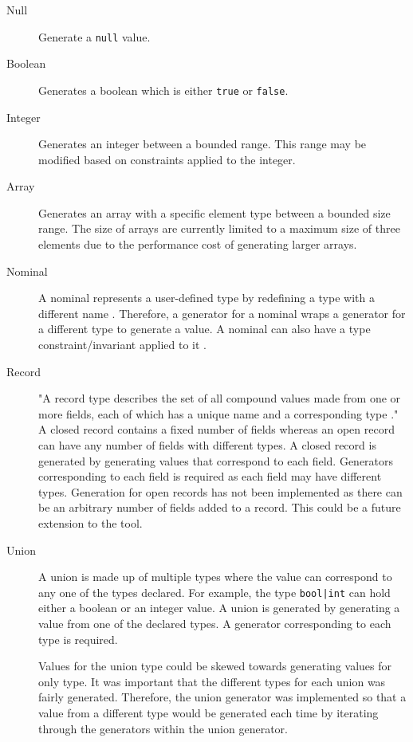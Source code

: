 \begin{description}
	\item[Null] Generate a \texttt{null} value.
	\item[Boolean] Generates a boolean which is either \texttt{true} or \texttt{false}.
	\item[Integer] Generates an integer between a bounded range. This range may be modified based on constraints applied to the integer.
	\item[Array] Generates an array with a specific element type between a bounded size range.
	The size of arrays are currently limited to a maximum size of three elements due to the performance cost of generating larger arrays.
	\item[Nominal] A nominal represents a user-defined type by redefining a type with a different name \cite{WhileyLang}. Therefore, a generator for a nominal wraps a generator for a different type to generate a value. A nominal can also have a type constraint/invariant applied to it \cite{WhileyLang}.
	\item[Record] "A record type describes the set of all compound values made from one or more fields, each of which has a unique name and a corresponding type \cite{WhileyLang}." A closed record contains a fixed number of fields whereas an open record can have any number of fields with different types.
	A closed record is generated by generating values that correspond to each field. Generators corresponding to each field is required as each field may have different types. 
	Generation for open records has not been implemented as there can be an arbitrary number of fields added to a record. This could be a future extension to the tool.
	\item[Union] A union is made up of multiple types where the value can correspond to any one of the types declared. For example, the type \texttt{bool|int} can hold either a boolean or an integer value. 
	A union is generated by generating a value from one of the declared types. A generator corresponding to each type is required. 
	
	Values for the union type could be skewed towards generating values for only type. It was important that the different types for each union was fairly generated. Therefore, the union generator was implemented so that a value from a different type would be generated each time by iterating through the generators within the union generator.

\end{description}

